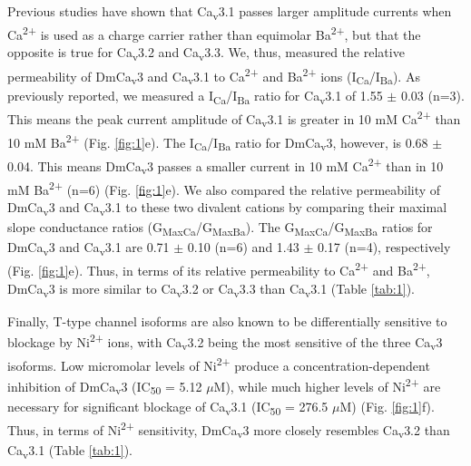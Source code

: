 Previous studies have shown that Ca\textsubscript{v}3.1 passes larger amplitude currents when Ca\textsuperscript{2+} is used as a charge carrier rather than equimolar Ba\textsuperscript{2+}, but that the opposite is true for Ca\textsubscript{v}3.2 and Ca\textsubscript{v}3.3\cite{mcrory:2000aa,shcheglovitov:2007aa}.
We, thus, measured the relative permeability of DmCa\textsubscript{v}3 and Ca\textsubscript{v}3.1 to Ca\textsuperscript{2+} and Ba\textsuperscript{2+} ions (I\textsubscript{Ca}/I\textsubscript{Ba}).
As previously reported, we measured a I\textsubscript{Ca}/I\textsubscript{Ba} ratio for Ca\textsubscript{v}3.1 of 1.55 $\pm$ 0.03 (n=3). This means the peak current amplitude of Ca\textsubscript{v}3.1 is greater in 10 mM Ca\textsuperscript{2+} than 10 mM Ba\textsuperscript{2+} (Fig. \ref{fig:1}e).
The I\textsubscript{Ca}/I\textsubscript{Ba} ratio for DmCa\textsubscript{v}3, however, is 0.68 $\pm$ 0.04. This means DmCa\textsubscript{v}3 passes a smaller current in 10 mM Ca\textsuperscript{2+} than in 10 mM Ba\textsuperscript{2+} (n=6) (Fig. \ref{fig:1}e).
We also compared the relative permeability of DmCa\textsubscript{v}3 and Ca\textsubscript{v}3.1 to these two divalent cations by comparing their maximal slope conductance ratios (G\textsubscript{MaxCa}/G\textsubscript{MaxBa}).
The G\textsubscript{MaxCa}/G\textsubscript{MaxBa} ratios for DmCa\textsubscript{v}3 and Ca\textsubscript{v}3.1 are 0.71 $\pm$ 0.10 (n=6) and 1.43 $\pm$ 0.17 (n=4), respectively (Fig. \ref{fig:1}e).
Thus, in terms of its relative permeability to Ca\textsuperscript{2+} and Ba\textsuperscript{2+}, DmCa\textsubscript{v}3 is more similar to Ca\textsubscript{v}3.2 or Ca\textsubscript{v}3.3 than Ca\textsubscript{v}3.1 (Table \ref{tab:1}).

Finally, T-type channel isoforms are also known to be differentially sensitive to blockage by Ni\textsuperscript{2+} ions, with Ca\textsubscript{v}3.2 being the most sensitive of the three Ca\textsubscript{v}3 isoforms\cite{lee:1999ab}.
Low micromolar levels of Ni\textsuperscript{2+} produce a concentration-dependent inhibition of DmCa\textsubscript{v}3 (IC\textsubscript{50} = 5.12 $\mu$M), while much higher levels of Ni\textsuperscript{2+} are necessary for significant blockage of Ca\textsubscript{v}3.1 (IC\textsubscript{50} = 276.5 $\mu$M) (Fig. \ref{fig:1}f).
Thus, in terms of Ni\textsuperscript{2+} sensitivity, DmCa\textsubscript{v}3 more closely resembles Ca\textsubscript{v}3.2 than Ca\textsubscript{v}3.1 (Table \ref{tab:1}).
